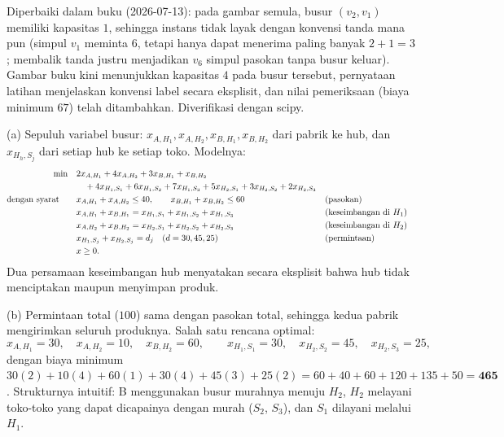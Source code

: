 \begin{qaflag}
Diperbaiki dalam buku (2026-07-13): pada gambar semula, busur $(v_2,v_1)$ memiliki kapasitas $1$, sehingga instans tidak layak dengan konvensi tanda mana pun (simpul $v_1$ meminta $6$, tetapi hanya dapat menerima paling banyak $2 + 1 = 3$; membalik tanda justru menjadikan $v_6$ simpul pasokan tanpa busur keluar). Gambar buku kini menunjukkan kapasitas $4$ pada busur tersebut, pernyataan latihan menjelaskan konvensi label secara eksplisit, dan nilai pemeriksaan (biaya minimum $67$) telah ditambahkan. Diverifikasi dengan scipy.
\end{qaflag}


(a) Sepuluh variabel busur: $x_{A,H_1}, x_{A,H_2}, x_{B,H_1}, x_{B,H_2}$ dari pabrik ke hub, dan $x_{H_h,S_j}$ dari setiap hub ke setiap toko. Modelnya:
\begin{align*}
\min \quad & 2x_{A,H_1} + 4x_{A,H_2} + 3x_{B,H_1} + x_{B,H_2}\\
& \quad + 4x_{H_1,S_1} + 6x_{H_1,S_2} + 7x_{H_1,S_3} + 5x_{H_2,S_1} + 3x_{H_2,S_2} + 2x_{H_2,S_3}\\
\mbox{dengan syarat}\quad \quad & x_{A,H_1} + x_{A,H_2} \leq 40, \qquad x_{B,H_1} + x_{B,H_2} \leq 60 && \mbox{(pasokan)}\\
& x_{A,H_1} + x_{B,H_1} = x_{H_1,S_1} + x_{H_1,S_2} + x_{H_1,S_3} && \mbox{(keseimbangan di } H_1)\\
& x_{A,H_2} + x_{B,H_2} = x_{H_2,S_1} + x_{H_2,S_2} + x_{H_2,S_3} && \mbox{(keseimbangan di } H_2)\\
& x_{H_1,S_j} + x_{H_2,S_j} = d_j \quad (d = 30, 45, 25) && \mbox{(permintaan)}\\
& x \geq 0.
\end{align*}
Dua persamaan keseimbangan hub menyatakan secara eksplisit bahwa hub tidak menciptakan maupun menyimpan produk.

(b) Permintaan total ($100$) sama dengan pasokan total, sehingga kedua pabrik mengirimkan seluruh produknya. Salah satu rencana optimal:
\[
x_{A,H_1} = 30, \quad x_{A,H_2} = 10, \quad x_{B,H_2} = 60, \qquad x_{H_1,S_1} = 30, \quad x_{H_2,S_2} = 45, \quad x_{H_2,S_3} = 25,
\]
dengan biaya minimum $30(2) + 10(4) + 60(1) + 30(4) + 45(3) + 25(2) = 60 + 40 + 60 + 120 + 135 + 50 = \mathbf{465}$. Strukturnya intuitif: B menggunakan busur murahnya menuju $H_2$, $H_2$ melayani toko-toko yang dapat dicapainya dengan murah ($S_2$, $S_3$), dan $S_1$ dilayani melalui $H_1$.

